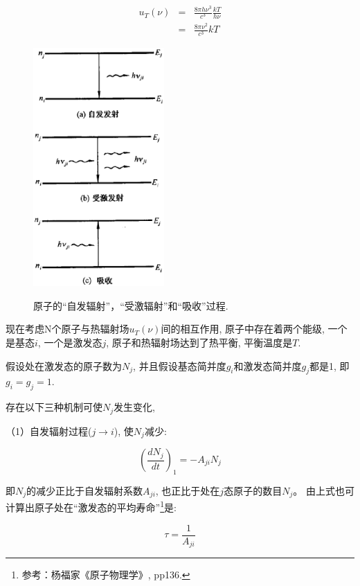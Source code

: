 \begin{eqnarray*}
  u_T(\nu) &=& \frac{8\pi h \nu^3}{c^3} \frac{kT}{h\nu} \\
  {} &=& \frac{8\pi \nu^2}{c^3}kT
\end{eqnarray*}

\begin{figure}[h]
\begin{center}
  \includegraphics[width=5cm]{Spectrum/einstein-ab.ps}\\
  \caption{原子的``自发辐射''，``受激辐射''和``吸收''过程.}\label{Einstein AB coefficients}
\end{center}
\end{figure}


现在考虑N个原子与热辐射场$u_T(\nu)$间的相互作用,
原子中存在着两个能级, 一个是基态$i$, 一个是激发态$j$,
原子和热辐射场达到了热平衡, 平衡温度是$T$.

假设处在激发态的原子数为$N_j$,
并且假设基态简并度$g_i$和激发态简并度$g_j$都是1, 即$g_i = g_j =1$.

存在以下三种机制可使$N_j$发生变化,

（1）自发辐射过程($j \to i$), 使$N_j$减少:

\begin{equation*}
   \left( \frac{dN_j}{dt}\right)_1 = - A_{ji}N_j
\end{equation*}

即$N_j$的减少正比于自发辐射系数$A_{ji}$,
也正比于处在$j$态原子的数目$N_j$。
由上式也可计算出原子处在``激发态的平均寿命''\footnote{参考：杨福家《原子物理学》,
pp136.}是:

\begin{equation}\label{life time for excited states}
    \tau = \frac{1}{A_{ji}}
\end{equation}


